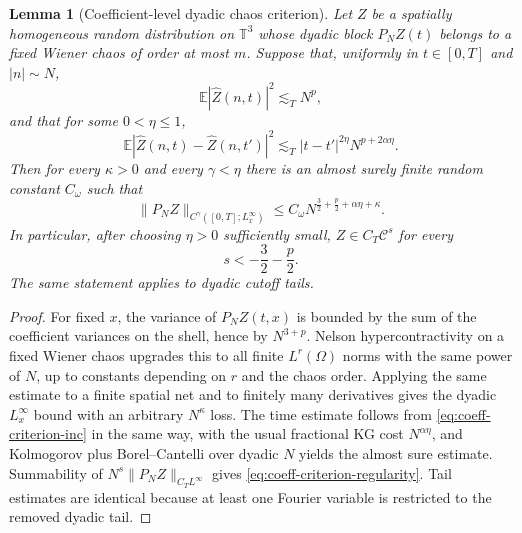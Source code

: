 \documentclass[10pt]{amsart}
\numberwithin{equation}{section}
\theoremstyle{plain}
\newtheorem{lemma}[theorem]{Lemma}
\theoremstyle{definition}
\theoremstyle{remark}
\newcommand{\T}{\mathbb{T}}
\newcommand{\E}{\mathbb{E}}
\newcommand{\C}{\mathcal{C}}
\begin{document}
\begin{lemma}[Coefficient-level dyadic chaos criterion]\label{lem:coeff-chaos-criterion}
Let $Z$ be a spatially homogeneous random distribution on $\T^3$ whose dyadic block $P_NZ(t)$ belongs to a fixed Wiener chaos of order at most $m$.  Suppose that, uniformly in $t\in[0,T]$ and $|n|\sim N$,
\begin{equation}\label{eq:coeff-criterion-fixed}
  \E |\widehat Z(n,t)|^2\lesssim_T N^p,
\end{equation}
and that for some $0<\eta\le1$,
\begin{equation}\label{eq:coeff-criterion-inc}
  \E |\widehat Z(n,t)-\widehat Z(n,t')|^2
  \lesssim_T |t-t'|^{2\eta}N^{p+2\alpha\eta}.
\end{equation}
Then for every $\kappa>0$ and every $\gamma<\eta$ there is an almost surely finite random constant $C_\omega$ such that
\begin{equation}\label{eq:coeff-criterion-block}
  \|P_NZ\|_{C^\gamma([0,T];L^\infty_x)}
  \le C_\omega N^{\frac32+\frac p2+\alpha\eta+\kappa}.
\end{equation}
In particular, after choosing $\eta>0$ sufficiently small, $Z\in C_T\C^s$ for every
\begin{equation}\label{eq:coeff-criterion-regularity}
  s< -\frac32-\frac p2.
\end{equation}
The same statement applies to dyadic cutoff tails.
\end{lemma}

\begin{proof}
For fixed $x$, the variance of $P_NZ(t,x)$ is bounded by the sum of the coefficient variances on the shell, hence by $N^{3+p}$.  Nelson hypercontractivity on a fixed Wiener chaos upgrades this to all finite $L^r(\Omega)$ norms with the same power of $N$, up to constants depending on $r$ and the chaos order.  Applying the same estimate to a finite spatial net and to finitely many derivatives gives the dyadic $L^\infty_x$ bound with an arbitrary $N^\kappa$ loss.  The time estimate follows from \eqref{eq:coeff-criterion-inc} in the same way, with the usual fractional KG cost $N^{\alpha\eta}$, and Kolmogorov plus Borel--Cantelli over dyadic $N$ yields the almost sure estimate.  Summability of $N^s\|P_NZ\|_{C_TL^\infty}$ gives \eqref{eq:coeff-criterion-regularity}.  Tail estimates are identical because at least one Fourier variable is restricted to the removed dyadic tail.
\end{proof}
\end{document}
